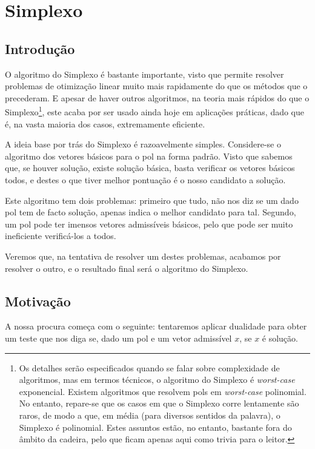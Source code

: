 \documentclass{article}
\theoremstyle{definition}
\begin{document}
	\section{Simplexo}
	
	\subsection{Introdução}
	
	O algoritmo do Simplexo é bastante importante, visto que permite resolver problemas de otimização linear muito mais rapidamente do que os métodos que o precederam. E apesar de haver outros algoritmos, na teoria mais rápidos do que o Simplexo\footnote{Os detalhes serão especificados quando se falar sobre complexidade de algoritmos, mas em termos técnicos, o algoritmo do Simplexo é \emph{worst-case} exponencial. Existem algoritmos que resolvem pols em \emph{worst-case} polinomial. No entanto, repare-se que os casos em que o Simplexo corre lentamente são raros, de modo a que, em média (para diversos sentidos da palavra), o Simplexo é polinomial. Estes assuntos estão, no entanto, bastante fora do âmbito da cadeira, pelo que ficam apenas aqui como trivia para o leitor.}, este acaba por ser usado ainda hoje em aplicações práticas, dado que é, na vasta maioria dos casos, extremamente eficiente.
	
	A ideia base por trás do Simplexo é razoavelmente simples. Considere-se o algoritmo dos vetores básicos para o pol na forma padrão. Visto que sabemos que, se houver solução, existe solução básica, basta verificar os vetores básicos todos, e destes o que tiver melhor pontuação é o nosso candidato a solução.
	
	Este algoritmo tem dois problemas: primeiro que tudo, não nos diz se um dado pol tem de facto solução, apenas indica o melhor candidato para tal. Segundo, um pol pode ter imensos vetores admissíveis básicos, pelo que pode ser muito ineficiente verificá-los a todos.
	
	Veremos que, na tentativa de resolver um destes problemas, acabamos por resolver o outro, e o resultado final será o algoritmo do Simplexo.
	
	\subsection{Motivação}
	
	A nossa procura começa com o seguinte: tentaremos aplicar dualidade para obter um teste que nos diga se, dado um pol e um vetor admissível $x$, se $x$ é solução.
	
\end{document}
